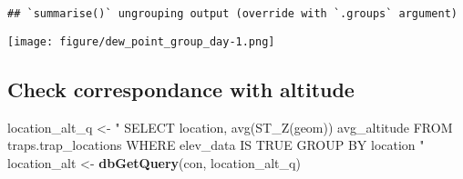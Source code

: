 \documentclass[]{article}
\newenvironment{Shaded}{\begin{snugshade}}{\end{snugshade}}
\newcommand{\KeywordTok}[1]{\textcolor[rgb]{0.13,0.29,0.53}{\textbf{#1}}}
\newcommand{\NormalTok}[1]{#1}
\newcommand{\StringTok}[1]{\textcolor[rgb]{0.31,0.60,0.02}{#1}}
\begin{document}
\begin{verbatim}
## `summarise()` ungrouping output (override with `.groups` argument)
\end{verbatim}

\texttt{[image: figure/dew\_point\_group\_day-1.png]}

\hypertarget{check-correspondance-with-altitude}{%
\subsection{Check correspondance with
altitude}\label{check-correspondance-with-altitude}}

\begin{Shaded}
\begin{Highlighting}[]
\NormalTok{location_alt_q <-}\StringTok{ "}
\StringTok{SELECT location, avg(ST_Z(geom)) avg_altitude}
\StringTok{FROM traps.trap_locations}
\StringTok{WHERE elev_data IS TRUE}
\StringTok{GROUP BY location}
\StringTok{"}
\NormalTok{location_alt <-}\StringTok{ }\KeywordTok{dbGetQuery}\NormalTok{(con, location_alt_q)}
\end{Highlighting}
\end{Shaded}
\end{document}
